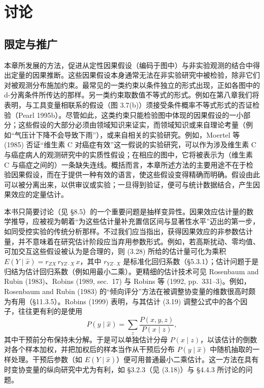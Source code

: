 \section{讨论}

\subsection{限定与推广}

本章所发展的方法，促进从定性因果假设（编码于图中）与非实验观测的结合中得出定量的因果推断。这些因果假设本身通常无法在非实验研究中被检验，除非它们对被观测分布施加约束。最常见的一类约束以条件独立的形式出现，正如各图中的 d-分离条件所传达的那样。另一类约束取数值不等式的形式。例如在第八章我们将表明，与工具变量相联系的假设（图 3.7(b)）须接受条件概率不等式形式的否证检验（Pearl 1995b）。尽管如此，这类约束只能检验图中体现的因果假设的一小部分；这些假设的大部分必须由领域知识来证实，而领域知识或来自理论考量（例如“气压计下降不会导致下雨”），或来自相关的实验研究。例如，Moertel 等 (1985) 否证“维生素 C 对癌症有效”这一假说的实验研究，可以作为涉及维生素 C 与癌症病人的观测研究中的实质性假设；在相应的图中，它将被表示为（维生素 C 与癌症之间的）一条缺失连线。概括而言，本章所述方法的主要用途不在于检验因果假设，而在于提供一种有效的语言，使这些假设变得精确而明确。假设由此可以被分离出来，以供审议或实验；一旦得到验证，便可与统计数据结合，产生因果效应的定量估计。

本书只简要讨论（见 \S 8.5）的一个重要问题是抽样变异性。因果效应估计量的数学推导，应被视为朝着“为这些估计量补充置信区间与显著性水平”迈出的第一步，如同受控实验的传统分析那样。不过我们应当指出，获得因果效应的非参数估计量，并不意味着在研究估计阶段应当弃用参数形式。例如，若高斯扰动、零均值、可加交互这些假设被认为是合理的，则 \textup{(3.28)} 所给的估计量可化为乘积 $E(Y\mid\hat{x})=r_{ZX}\,r_{YZ\cdot X}\,x$，其中 $r_{YZ\cdot X}$ 是标准化回归系数（\S 5.3.1）；估计问题于是归结为估计回归系数（例如用最小二乘）。更精细的估计技术可见 Rosenbaum and Rubin (1983)、Robins (1989, sec.~17) 与 Robins 等 (1992, pp.~331--3)。例如，Rosenbaum and Rubin (1983) 的“倾向评分”方法在被调整协变量的维数很高时颇为有用（\S 11.3.5）。Robins (1999) 表明，与其估计 \textup{(3.19)} 调整公式中的各个因子，往往更有利的是使用
\[
P(y\mid\hat{x})=\sum_{z}\frac{P(x,y,z)}{P(x\mid z)},
\]
其中干预前分布保持未分解。于是可以单独估计分母 $P(x\mid z)$，以该估计的倒数对各个样本加权，并把加权后的样本当作从干预后分布 $P(y\mid\hat{x})$ 中随机抽取的一样处理。干预后参数（如 $E(Y\mid\hat{x})$）便可用普通最小二乘估计。这一方法在具有时变协变量的纵向研究中尤为有利，如 \S 3.2.3（见 \textup{(3.18)}）与 \S 4.4.3 所讨论的问题。

